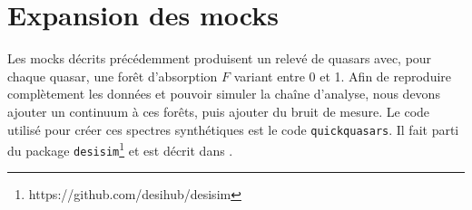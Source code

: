 \section{Expansion des mocks}
\label{sec:quickquasars}

Les mocks décrits précédemment produisent un relevé de quasars avec, pour chaque quasar, une forêt d'absorption $F$ variant entre 0 et 1.
Afin de reproduire complètement les données et pouvoir simuler la chaîne d'analyse, nous devons ajouter un continuum à ces forêts, puis ajouter du bruit de mesure.
Le code utilisé pour créer ces spectres synthétiques est le code \texttt{quickquasars}. Il fait parti du package \texttt{desisim}\footnote{https://github.com/desihub/desisim} et est décrit dans \textcite{Gonzalez-Morales}. 

